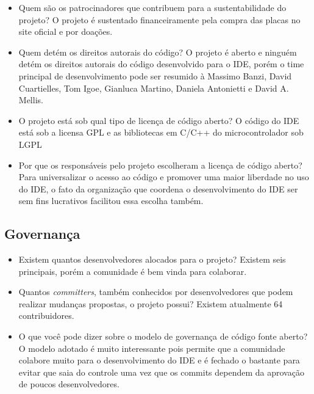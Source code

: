 \documentclass[12pt,a4paper]{article} %
\begin{document}
\begin{itemize}
\item Quem são os patrocinadores que contribuem para a sustentabilidade do projeto?
\subitem O projeto é sustentado financeiramente pela compra das placas no site oficial e por doações.
\\
\item Quem detém os direitos autorais do código?
\subitem O projeto é aberto e ninguém detém os direitos autorais do código desenvolvido para o IDE, porém o time principal de desenvolvimento pode ser resumido à Massimo Banzi, David Cuartielles, Tom Igoe, Gianluca Martino, Daniela Antonietti e David A. Mellis.
\\
\item O projeto está sob qual tipo de licença de código aberto?
\subitem O código do IDE está sob a licensa GPL e as bibliotecas em C/C++ do microcontrolador sob LGPL
\\
\item Por que os responsáveis pelo projeto escolheram a licença de código aberto?
\subitem Para universalizar o acesso ao código e promover uma maior liberdade no uso do IDE, o fato da organização que coordena o desenvolvimento do IDE ser sem fins lucrativos facilitou essa escolha também.
\end{itemize}

\subsection{Governança}


\begin{itemize}
\item Existem quantos desenvolvedores alocados para o projeto?
\subitem Existem seis principais, porém a comunidade é bem vinda para colaborar.
\\
\item Quantos \textit{committers}, também conhecidos por desenvolvedores que podem realizar mudanças propostas, o projeto possui?
\subitem Existem atualmente 64 contribuidores.
\\
\item O que você pode dizer sobre o modelo de governança de código fonte aberto?
\subitem O modelo adotado é muito interessante pois permite que a comunidade colabore muito para o desenvolvimento do IDE e é fechado o bastante para evitar que saia do controle uma vez que os commits dependem da aprovação de poucos desenvolvedores.
\\
\end{itemize}
\end{document}
